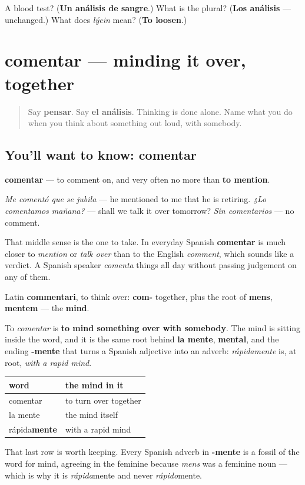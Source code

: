 \begin{tcolorbox}[breakable,colback=teal!4,colframe=teal!35!black,title={Before you move on}]
A blood test? (\textbf{Un análisis de sangre}.) What is the plural? (\textbf{Los análisis} — unchanged.) What does \emph{lýein} mean? (\textbf{To loosen}.)
\end{tcolorbox}
\section[comentar]{comentar — minding it over, together}

\label{lesson:ES-C447-comentar}



\begin{quote}
Say \textbf{pensar}. Say \textbf{el análisis}. Thinking is done alone. Name what you do when you think about something out loud, with somebody.
\end{quote}

\subsection*{You'll want to know: comentar}
\textbf{comentar} — to comment on, and very often no more than \textbf{to mention}.

\emph{Me comentó que se jubila} — he mentioned to me that he is retiring. \emph{¿Lo comentamos mañana?} — shall we talk it over tomorrow? \emph{Sin comentarios} — no comment.

That middle sense is the one to take. In everyday Spanish \textbf{comentar} is much closer to \emph{mention} or \emph{talk over} than to the English \emph{comment}, which sounds like a verdict. A Spanish speaker \emph{comenta} things all day without passing judgement on any of them.

\begin{cousinweb}
Latin \textbf{commentari}, to think over: \textbf{com-} together, plus the root of \textbf{mens}, \textbf{mentem} — the \textbf{mind}.

To \emph{comentar} is \textbf{to mind something over with somebody}. The mind is sitting inside the word, and it is the same root behind \textbf{la mente}, \textbf{mental}, and the ending \textbf{-mente} that turns a Spanish adjective into an adverb: \emph{rápidamente} is, at root, \emph{with a rapid mind}.

\noindent
\begin{tabularx}{\linewidth}{@{}>{\raggedright\arraybackslash}X>{\raggedright\arraybackslash}X@{}}
\toprule
\textbf{word} & \textbf{the mind in it} \\
\midrule
comentar & to turn over together \\
la mente & the mind itself \\
rápida\textbf{mente} & with a rapid mind \\
\bottomrule
\end{tabularx}

That last row is worth keeping. Every Spanish adverb in \textbf{-mente} is a fossil of the word for mind, agreeing in the feminine because \emph{mens} was a feminine noun — which is why it is \emph{rápida}mente and never \emph{rápido}mente.
\end{cousinweb}

